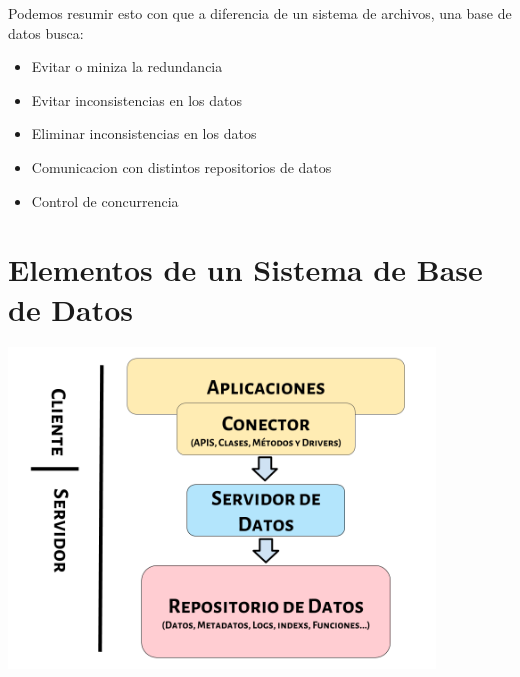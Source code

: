 \documentclass[12pt, fleqn]{report}                             %
\begin{document}
            \clearpage

            Podemos resumir esto con que a diferencia de un sistema de archivos, una base de datos busca:
            \begin{itemize}
                \item Evitar o miniza la redundancia
                \item Evitar inconsistencias en los datos
                \item Eliminar inconsistencias en los datos
                \item Comunicacion con distintos repositorios de datos
                \item Control de concurrencia
            \end{itemize}




        \clearpage
        \section{Elementos de un Sistema de Base de Datos}

            \includegraphics[width=0.85\textwidth]{DiagramaPartes.png}
\end{document}
